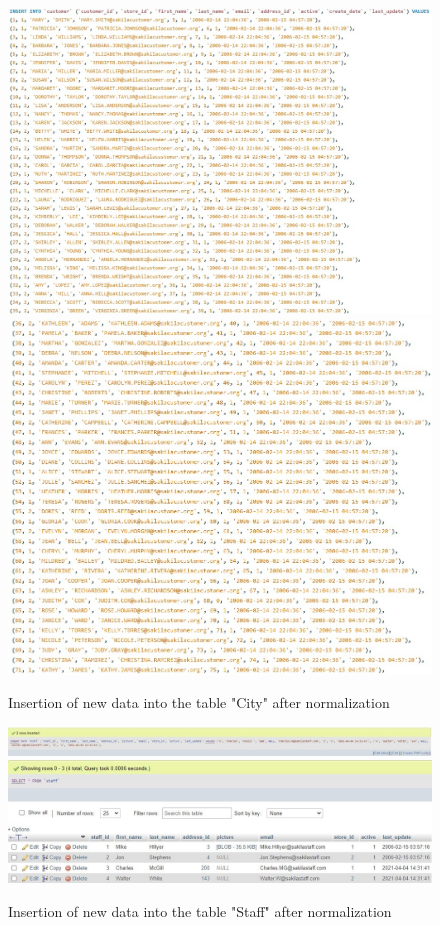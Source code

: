 \documentclass{article}
\begin{document}
		\begin{figure}[H]
			\includegraphics[width=\textwidth]{city1_insert_norm}
			\includegraphics[width=\textwidth]{city2_insert_norm}
			\caption{Insertion of new data into the table "City" after normalization}
		\end{figure}
		\begin{figure}[H]
			\includegraphics[width=\textwidth]{staff1_insert_norm}
			\includegraphics[width=\textwidth]{staff2_insert_norm}
			\caption{Insertion of new data into the table "Staff" after normalization}
		\end{figure}
\end{document}
